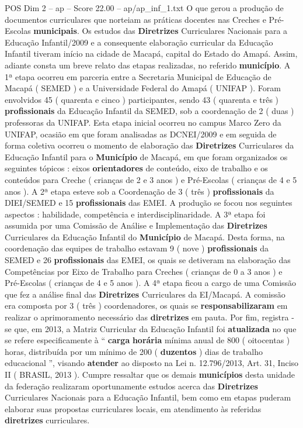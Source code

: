 \begin{textsample}{POS Dim 2 – ap – Score 22.00 – ap/ap\_inf\_1.txt}
O que gerou a produção de documentos curriculares que norteiam as práticas docentes nas Creches e Pré-Escolas \textbf{municipais}.
Os estudos das \textbf{Diretrizes} Curriculares Nacionais para a Educação Infantil/2009 e a consequente elaboração curricular da Educação Infantil tiveram início na cidade de Macapá, capital do Estado do Amapá.
Assim, adiante consta um breve relato das etapas realizadas, no referido \textbf{município}.
A 1ª etapa ocorreu em parceria entre a Secretaria Municipal de Educação de Macapá ( SEMED ) e a Universidade Federal do Amapá ( UNIFAP ).
Foram envolvidos 45 ( quarenta e cinco ) participantes, sendo 43 ( quarenta e três ) \textbf{profissionais} da Educação Infantil da SEMED, sob a coordenação de 2 ( duas ) professoras da UNIFAP.
Esta etapa inicial ocorreu no campus Marco Zero da UNIFAP, ocasião em que foram analisadas as DCNEI/2009 e em seguida de forma coletiva ocorreu o momento de elaboração das \textbf{Diretrizes} Curriculares da Educação Infantil para o \textbf{Município} de Macapá, em que foram organizados os seguintes tópicos : eixos \textbf{orientadores} de conteúdo, eixo de trabalho e os conteúdos para Creche ( crianças de 2 e 3 anos ) e Pré-Escolas ( crianças de 4 e 5 anos ).
A 2ª etapa esteve sob a Coordenação de 3 ( três ) \textbf{profissionais} da DIEI/SEMED e 15 \textbf{profissionais} das EMEI.
A produção se focou nos seguintes aspectos : habilidade, competência e interdisciplinaridade.
A 3ª etapa foi assumida por uma Comissão de Análise e Implementação das \textbf{Diretrizes} Curriculares da Educação Infantil do \textbf{Município} de Macapá.
Desta forma, na coordenação das equipes de trabalho estavam 9 ( nove ) \textbf{profissionais} da SEMED e 26 \textbf{profissionais} das EMEI, os quais se detiveram na elaboração das Competências por Eixo de Trabalho para Creches ( crianças de 0 a 3 anos ) e Pré-Escolas ( crianças de 4 e 5 anos ).
A 4ª etapa ficou a cargo de uma Comissão que fez a análise final das \textbf{Diretrizes} Curriculares da EI/Macapá.
A comissão era composta por 3 ( três ) coordenadores, os quais se \textbf{responsabilizaram} em realizar o aprimoramento necessário das \textbf{diretrizes} em pauta.
Por fim, registra -se que, em 2013, a Matriz Curricular da Educação Infantil foi \textbf{atualizada} no que se refere especificamente à “ \textbf{carga} \textbf{horária} mínima anual de 800 ( oitocentas ) horas, distribuída por um mínimo de 200 ( \textbf{duzentos} ) dias de trabalho educacional ”, visando \textbf{atender} ao disposto na Lei n. 12.796/2013, Art. 31, Inciso II ( BRASIL, 2013 ).
Cumpre ressaltar que os demais \textbf{municípios} desta unidade da federação realizaram oportunamente estudos acerca das \textbf{Diretrizes} Curriculares Nacionais para a Educação Infantil, bem como em etapas puderam elaborar suas propostas curriculares locais, em atendimento às referidas \textbf{diretrizes} curriculares.

\end{textsample}
